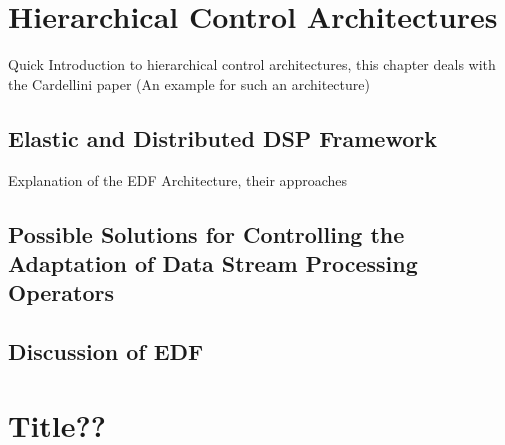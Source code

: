     \section{Hierarchical Control Architectures}
    Quick Introduction to hierarchical control architectures, this chapter deals with the Cardellini
    paper (An example for such an architecture)

        \subsection{Elastic and Distributed DSP Framework}
        Explanation of the EDF Architecture, their approaches

        \subsection{Possible Solutions for Controlling the Adaptation of Data Stream Processing Operators}

        \subsection{Discussion of EDF}

    \section{Title??}

